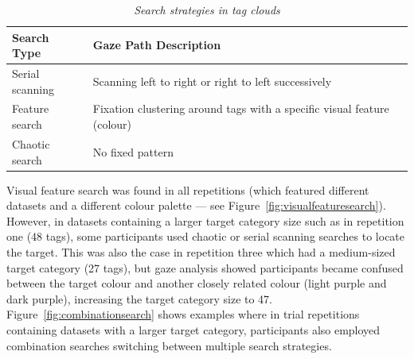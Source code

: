 \begin{table}
\centering
\caption{\textit{Search strategies in tag clouds}}
\begin{tabular}{|p{3cm}|p{5cm}|} \hline
\textbf{Search Type}&\textbf{Gaze Path Description}\\ \hline
Serial scanning & Scanning left to right or right to left successively\\ \hline
Feature search & Fixation clustering around tags with a specific visual feature (colour)\\ \hline
Chaotic search & No fixed pattern\\ 
\hline\end{tabular}
\label{table:searchstrategies}
\end{table}

Visual feature search was found in all repetitions (which featured different datasets and a different colour palette --- see Figure~\vref{fig:visualfeaturesearch}). However, in datasets containing a larger target category size such as in repetition one (48 tags), some participants used chaotic or serial scanning searches to locate the target. This was also the case in repetition three which had a medium-sized target category (27 tags), but gaze analysis showed participants became confused between the target colour and another closely related colour (light purple and dark purple), increasing the target category size to 47. Figure~\vref{fig:combinationsearch} shows examples where in trial repetitions containing datasets with a larger target category, participants also employed combination searches switching between multiple search strategies.

